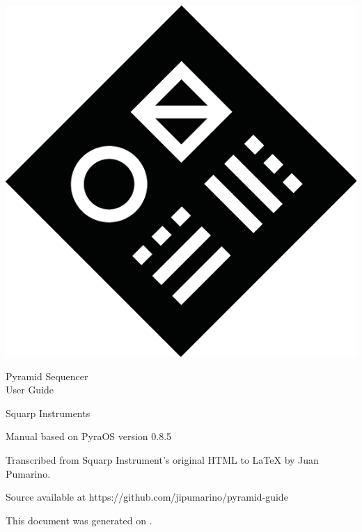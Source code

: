 \thispagestyle{coverpagestyle}
\vspace*{\fill}
\begin{center}
\includegraphics{figs/squarplogo.png}

\fontsize{30}{30}\futurafont
Pyramid Sequencer\\
User Guide

\fontsize{18}{18}\futurafont
Squarp Instruments
\end{center}
\vspace*{\fill}

\newpage
\thispagestyle{coverpagestyle}

\vspace*{\fill}

Manual based on PyraOS version 0.8.5

Transcribed from Squarp Instrument's original HTML to \LaTeX{} by Juan Pumarino.

Source available at https://github.com/jipumarino/pyramid-guide

This document was generated on \DTMnow.

\vspace*{\fill}

\newpage